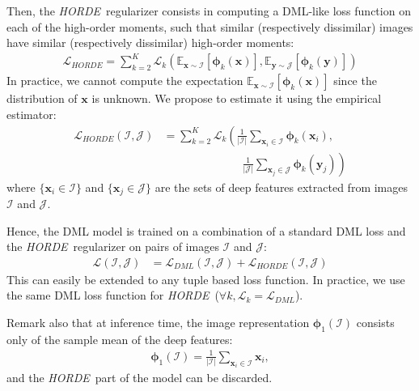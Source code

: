 \documentclass[10pt,twocolumn,letterpaper]{article}
\def\vx{{\bm{x}}}
\def\vy{{\bm{y}}}
\newcommand{\E}{\mathbb{E}}
\def\ourmethod{\textit{HORDE}}
\begin{document}
        Then, the \ourmethod \ regularizer consists in computing a DML-like loss function on each of the high-order moments, such that similar (respectively dissimilar) images have similar (respectively dissimilar) high-order moments:
                \begin{align}
            \mathcal{L}_{\ourmethod} = \sum_{k=2}^K \mathcal{L}_k \left(\E_{\vx \sim \mathcal{I}}[\boldsymbol{\phi}_k(\vx)], \E_{\vy \sim \mathcal{J}}[\boldsymbol{\phi}_k(\vy)]\right)
        \end{align}
        In practice, we cannot compute the expectation $\E_{\vx \sim \mathcal{I}}[\boldsymbol{\phi}_k(\vx)]$ since the distribution of $\vx$ is unknown.
        We propose to estimate it using the empirical estimator:
        \begin{align}\label{eq:loss_horde}
            \nonumber \mathcal{L}_{\ourmethod}(\mathcal{I}, \mathcal{J}) &= \sum_{k=2}^K \mathcal{L}_k \left(\frac{1}{\vert\mathcal{I}\vert}\sum_{\vx_i \in \mathcal{I}} \boldsymbol{\phi}_k(\vx_i),\right.\\
            &\quad\qquad\qquad\qquad \left. \frac{1}{\vert\mathcal{J}\vert}\sum_{\vx_j\in\mathcal{J}} \boldsymbol{\phi}_k(\vy_j)\right)
        \end{align}
        where $\{\vx_i \in \mathcal{I}\}$ and $\{\vx_j \in \mathcal{J}\}$ are the sets of deep features extracted from images $\mathcal{I}$ and $\mathcal{J}$.
        
        Hence, the DML model is trained on a combination of a standard DML loss and the \ourmethod \ regularizer on pairs of images $\mathcal{I}$ and $\mathcal{J}$:
        \begin{align}
            \mathcal{L}(\mathcal{I}, \mathcal{J}) &= \mathcal{L}_\textit{DML}(\mathcal{I}, \mathcal{J}) + \mathcal{L}_{\ourmethod}(\mathcal{I}, \mathcal{J})
        \end{align}
        This can easily be extended to any tuple based loss function.
        In practice, we use the same DML loss function for \ourmethod \ ($\forall k, \mathcal{L}_k = \mathcal{L}_\textit{DML}$).
        
        Remark also that at inference time, the image representation $\boldsymbol{\phi}_1(\mathcal{I})$ consists only of the sample mean of the deep features:
        \begin{align}
            \boldsymbol{\phi}_1(\mathcal{I}) = \frac{1}{\vert \mathcal{I}\vert}\sum_{\vx_i \in \mathcal{I}} \vx_i, 
        \end{align}
        and the \ourmethod \ part of the model can be discarded.
        
\end{document}
